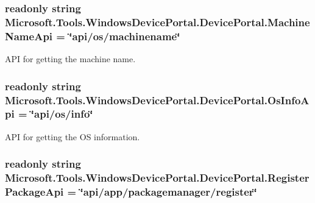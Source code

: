 \subsubsection[{\texorpdfstring{Machine\+Name\+Api}{MachineNameApi}}]{\setlength{\rightskip}{0pt plus 5cm}readonly string Microsoft.\+Tools.\+Windows\+Device\+Portal.\+Device\+Portal.\+Machine\+Name\+Api = \char`\"{}api/os/machinename\char`\"{}\hspace{0.3cm}{\ttfamily [static]}}\hypertarget{class_microsoft_1_1_tools_1_1_windows_device_portal_1_1_device_portal_a2ad83b9a2f3e3630b49be04e1880aa63}{}\label{class_microsoft_1_1_tools_1_1_windows_device_portal_1_1_device_portal_a2ad83b9a2f3e3630b49be04e1880aa63}


A\+PI for getting the machine name. 

\subsubsection[{\texorpdfstring{Os\+Info\+Api}{OsInfoApi}}]{\setlength{\rightskip}{0pt plus 5cm}readonly string Microsoft.\+Tools.\+Windows\+Device\+Portal.\+Device\+Portal.\+Os\+Info\+Api = \char`\"{}api/os/info\char`\"{}\hspace{0.3cm}{\ttfamily [static]}}\hypertarget{class_microsoft_1_1_tools_1_1_windows_device_portal_1_1_device_portal_a332f2b67f2e05b5e822124893424b6a4}{}\label{class_microsoft_1_1_tools_1_1_windows_device_portal_1_1_device_portal_a332f2b67f2e05b5e822124893424b6a4}


A\+PI for getting the OS information. 

\subsubsection[{\texorpdfstring{Register\+Package\+Api}{RegisterPackageApi}}]{\setlength{\rightskip}{0pt plus 5cm}readonly string Microsoft.\+Tools.\+Windows\+Device\+Portal.\+Device\+Portal.\+Register\+Package\+Api = \char`\"{}api/app/packagemanager/register\char`\"{}\hspace{0.3cm}{\ttfamily [static]}}\hypertarget{class_microsoft_1_1_tools_1_1_windows_device_portal_1_1_device_portal_a4e96c976440b2f52b6f8ebe63b2338b8}{}\label{class_microsoft_1_1_tools_1_1_windows_device_portal_1_1_device_portal_a4e96c976440b2f52b6f8ebe63b2338b8}


